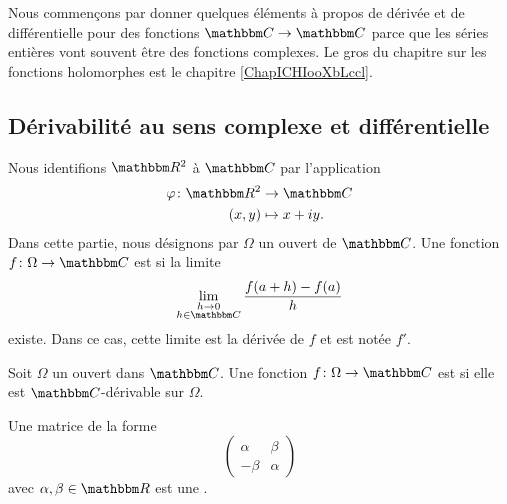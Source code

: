 
Nous commençons par donner quelques éléments à propos de dérivée et de différentielle pour des fonctions \( \eC\to \eC\) parce que les séries entières vont souvent être des fonctions complexes. Le gros du chapitre sur les fonctions holomorphes est le chapitre \ref{ChapICHIooXbLccl}.

\subsection{Dérivabilité au sens complexe et différentielle}

Nous identifions \( \eR^2\) à \( \eC\) par l'application
\begin{equation}
    \begin{aligned}
        \varphi\colon \eR^2&\to \eC \\
        (x,y)&\mapsto x+iy. 
    \end{aligned}
\end{equation}
Dans cette partie, nous désignons par \( \Omega\) un ouvert de \( \eC\). Une fonction \( f\colon \Omega\to \eC\) est  si la limite
\begin{equation}
    \lim_{\substack{h\to0\\h\in \eC}} \frac{ f(a+h)-f(a) }{ h }
\end{equation}
existe. Dans ce cas, cette limite est la dérivée de \( f\) et est notée \( f'\).

\begin{definition}  \label{DefMMpjJZ}
    Soit \( \Omega\) un ouvert dans \( \eC\). Une fonction \( f\colon \Omega\to \eC\) est  si elle est \( \eC\)-dérivable sur \( \Omega\). 
\end{definition}

\begin{definition}
    Une matrice de la forme
    \begin{equation}
        \begin{pmatrix}
            \alpha    &   \beta    \\ 
            -\beta    &   \alpha    
        \end{pmatrix}
    \end{equation}
    avec \( \alpha,\beta\in \eR\) est une .
\end{definition}

